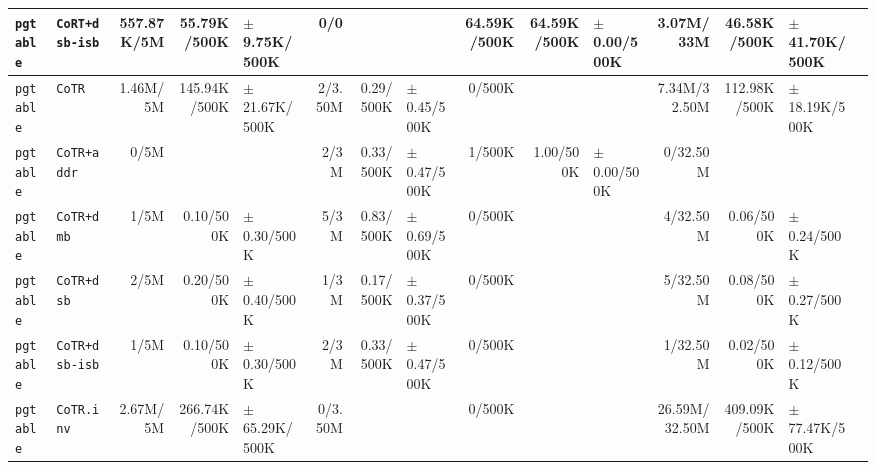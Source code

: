 \begin{tabular}{l l  | r r l | r r l | r r l | r r l l}
     \verb|pgtable| &                                        \verb|CoRT+dsb-isb| &     557.87K/5M &           55.79K/500K &  $\pm$ 9.75K/500K &            0/0 &                       &                 &    64.59K/500K &           64.59K/500K &   $\pm$ 0.00/500K &      3.07M/33M &           46.58K/500K & $\pm$ 41.70K/500K & \\ \hline 
     \verb|pgtable| &                                                \verb|CoTR| &       1.46M/5M &          145.94K/500K & $\pm$ 21.67K/500K &        2/3.50M &             0.29/500K & $\pm$ 0.45/500K &         0/500K &                       &                   &   7.34M/32.50M &          112.98K/500K & $\pm$ 18.19K/500K & \\ \hline 
     \verb|pgtable| &                                           \verb|CoTR+addr| &           0/5M &                       &                   &           2/3M &             0.33/500K & $\pm$ 0.47/500K &         1/500K &             1.00/500K &   $\pm$ 0.00/500K &       0/32.50M &                       &                   & \\ \hline 
     \verb|pgtable| &                                            \verb|CoTR+dmb| &           1/5M &             0.10/500K &   $\pm$ 0.30/500K &           5/3M &             0.83/500K & $\pm$ 0.69/500K &         0/500K &                       &                   &       4/32.50M &             0.06/500K &   $\pm$ 0.24/500K & \\ \hline 
     \verb|pgtable| &                                            \verb|CoTR+dsb| &           2/5M &             0.20/500K &   $\pm$ 0.40/500K &           1/3M &             0.17/500K & $\pm$ 0.37/500K &         0/500K &                       &                   &       5/32.50M &             0.08/500K &   $\pm$ 0.27/500K & \\ \hline 
     \verb|pgtable| &                                        \verb|CoTR+dsb-isb| &           1/5M &             0.10/500K &   $\pm$ 0.30/500K &           2/3M &             0.33/500K & $\pm$ 0.47/500K &         0/500K &                       &                   &       1/32.50M &             0.02/500K &   $\pm$ 0.12/500K & \\ \hline 
     \verb|pgtable| &                                            \verb|CoTR.inv| &       2.67M/5M &          266.74K/500K & $\pm$ 65.29K/500K &        0/3.50M &                       &                 &         0/500K &                       &                   &  26.59M/32.50M &          409.09K/500K & $\pm$ 77.47K/500K & \\ \hline 

\end{tabular}
